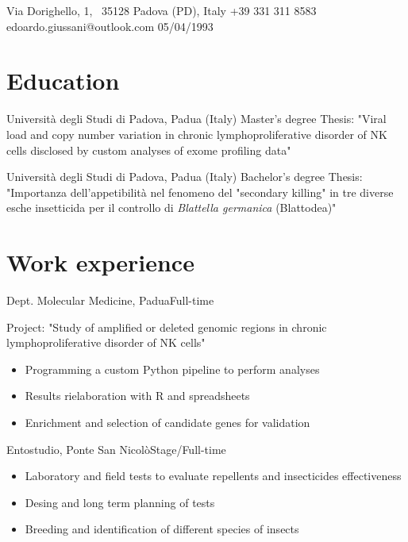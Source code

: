\documentclass{fancy_cv}
\author{Edoardo Giussani}
\begin{document}
    {Via Dorighello, 1, \ 35128 Padova (PD), Italy}
    {+39 331 311 8583}
    {edoardo.giussani@outlook.com}
    {05/04/1993}

    \section{Education}
            {Università degli Studi di Padova, Padua (Italy)} {Master's degree}
            {%
            Thesis: "Viral load and copy number variation in chronic 
            lymphoproliferative disorder of NK cells disclosed by custom analyses
            of exome profiling data"}
        \medskip

            {Università degli Studi di Padova, Padua (Italy)} {Bachelor's degree}
            {%
            Thesis: "Importanza dell'appetibilità nel fenomeno del "secondary 
            killing" in tre diverse esche insetticida per il controllo
            di \textit{Blattella germanica} (Blattodea)"}


    \section{Work experience}
            {Dept. Molecular Medicine, Padua}{Full-time}
            {Project: "Study of amplified or deleted genomic regions in chronic 
            lymphoproliferative disorder of NK cells"
            \begin{itemize}
                \item Programming a custom Python pipeline to perform analyses
                \item Results rielaboration with R and spreadsheets
                \item Enrichment and selection of candidate genes for validation 
            \end{itemize}}
        \medskip

            {Entostudio, Ponte San Nicolò}{Stage/Full-time}
            {\begin{itemize}
                \item Laboratory and field tests to evaluate repellents and insecticides effectiveness 
                \item Desing and long term planning of tests
                \item Breeding and identification of different species of insects
            \end{itemize}}
\end{document}
